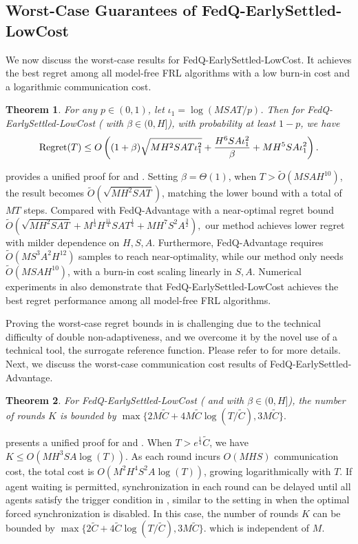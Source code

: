\documentclass{article}
\newtheorem{theorem}{Theorem}[section]
\begin{document}
\subsection{Worst-Case Guarantees of FedQ-EarlySettled-LowCost}
We now discuss the worst-case results for FedQ-EarlySettled-LowCost. It achieves the best regret among all model-free FRL algorithms with a low burn-in cost and a logarithmic communication cost.
\begin{theorem}
\label{thm_fedregret} 
    For any $p \in (0,1)$, let $\iota_1 = \log(MSAT/p)$. Then for FedQ-EarlySettled-LowCost ( with $\beta \in (0,H]$), with probability at least $1-p$, we have
$$\textnormal{Regret}(T) \leq O\left((1+\beta) \sqrt{MH^2SAT\iota_1^2} + \frac{H^6SA\iota_1^2}{\beta}+MH^5SA\iota_1^{2}\right).$$
\end{theorem}
 provides a unified proof for  and . Setting $\beta = \Theta(1)$, when $T > \tilde{O}(MSAH^{10})$, the result becomes $\tilde{O}(\sqrt{MH^2 S A T})$, matching the lower bound with a total of $MT$ steps. Compared with FedQ-Advantage \cite{zheng2024federated} with a near-optimal regret bound $\tilde{O}(\sqrt{MH^2 S A T} + M^{\frac{1}{4}}H^{\frac{11}{4}}SAT^{\frac{1}{4}}+ MH^7 S^2 A^{\frac{3}{2}}),$ our method achieves lower regret with milder dependence on $H,S,A$. Furthermore, FedQ-Advantage requires \( \tilde{O}(MS^3A^2H^{12}) \) samples to reach near-optimality, while our method only needs \( \tilde{O}(MSAH^{10}) \), with a burn-in cost scaling linearly in $S,A$. Numerical experiments in  also demonstrate that FedQ-EarlySettled-LowCost achieves the best regret performance among all model-free FRL algorithms.

Proving the worst-case regret bounds in  is challenging due to the technical difficulty of double non-adaptiveness, and we overcome it by the novel use of a technical tool, the surrogate reference function. Please refer to  for more details. Next, we discuss the worst-case communication cost results of FedQ-EarlySettled-Advantage.
\begin{theorem}
\label{thm_fedwccost} 
For FedQ-EarlySettled-LowCost ( and  with $\beta \in (0,H]$),  the number of rounds $K$ is bounded by $\max\{2M\tilde{C}+ 4M\tilde{C}\log(T/\tilde{C}), 3M\tilde{C}\}.$
\end{theorem}
 presents a unified proof for  and . When $T > e^{\frac{1}{4}}\tilde{C}$, we have $K \leq O(MH^3SA\log(T))$. As each round incurs \( O(MHS) \) communication cost, the total cost is $O(M^2H^4S^2A\log(T))$, growing logarithmically with $T$. If agent waiting is permitted, synchronization in each round can be delayed until all agents satisfy the trigger condition in , similar to the setting in \cite{zheng2024federated} when the optimal forced synchronization is disabled. In this case, the number of rounds \( K \) can be bounded by 
$\max\{2\tilde{C}+ 4\tilde{C}\log(T/\tilde{C}), 3M\tilde{C}\}.$ which is independent of \( M \).
\end{document}
